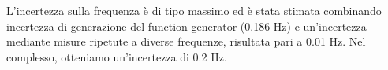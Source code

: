 \documentclass[../Relazione_circuiti]{subfile}
\begin{document}
L'incertezza sulla frequenza è di tipo massimo ed è stata stimata combinando incertezza di generazione del function generator (0.186 Hz) e un'incertezza mediante misure ripetute a diverse frequenze, risultata pari a 0.01 Hz. Nel complesso, otteniamo un'incertezza di 0.2 Hz.
\end{document}
